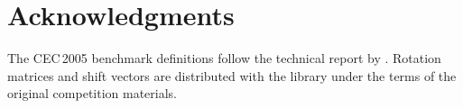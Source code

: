 \documentclass[11pt,a4paper]{article}
\begin{document}
\section*{Acknowledgments}

The CEC\,2005 benchmark definitions follow the technical
report by \citet{Suganthan2005}. Rotation matrices and shift vectors are
distributed with the library under the terms of the original competition
materials.



\end{document}

